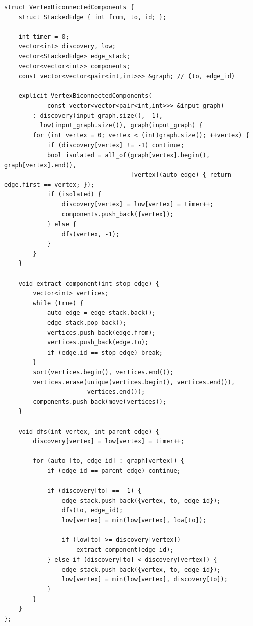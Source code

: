 \begin{lstlisting}[style=cpp]
struct VertexBiconnectedComponents {
    struct StackedEdge { int from, to, id; };

    int timer = 0;
    vector<int> discovery, low;
    vector<StackedEdge> edge_stack;
    vector<vector<int>> components;
    const vector<vector<pair<int,int>>> &graph; // (to, edge_id)

    explicit VertexBiconnectedComponents(
            const vector<vector<pair<int,int>>> &input_graph)
        : discovery(input_graph.size(), -1),
          low(input_graph.size()), graph(input_graph) {
        for (int vertex = 0; vertex < (int)graph.size(); ++vertex) {
            if (discovery[vertex] != -1) continue;
            bool isolated = all_of(graph[vertex].begin(), graph[vertex].end(),
                                   [vertex](auto edge) { return edge.first == vertex; });
            if (isolated) {
                discovery[vertex] = low[vertex] = timer++;
                components.push_back({vertex});
            } else {
                dfs(vertex, -1);
            }
        }
    }

    void extract_component(int stop_edge) {
        vector<int> vertices;
        while (true) {
            auto edge = edge_stack.back();
            edge_stack.pop_back();
            vertices.push_back(edge.from);
            vertices.push_back(edge.to);
            if (edge.id == stop_edge) break;
        }
        sort(vertices.begin(), vertices.end());
        vertices.erase(unique(vertices.begin(), vertices.end()),
                       vertices.end());
        components.push_back(move(vertices));
    }

    void dfs(int vertex, int parent_edge) {
        discovery[vertex] = low[vertex] = timer++;

        for (auto [to, edge_id] : graph[vertex]) {
            if (edge_id == parent_edge) continue;

            if (discovery[to] == -1) {
                edge_stack.push_back({vertex, to, edge_id});
                dfs(to, edge_id);
                low[vertex] = min(low[vertex], low[to]);

                if (low[to] >= discovery[vertex])
                    extract_component(edge_id);
            } else if (discovery[to] < discovery[vertex]) {
                edge_stack.push_back({vertex, to, edge_id});
                low[vertex] = min(low[vertex], discovery[to]);
            }
        }
    }
};
\end{lstlisting}

